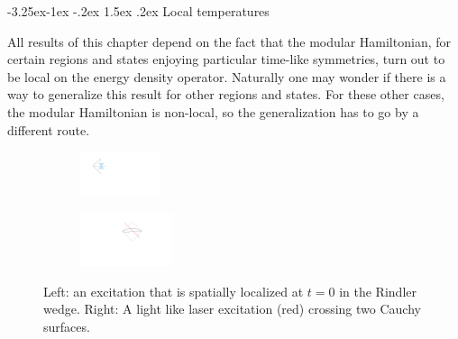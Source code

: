 \documentclass[11pt]{article}
\makeatletter
\renewcommand\subsection{\@startsection{subsection}{2}{\z@}%
                                   {-3.25ex\@plus -1ex \@minus -.2ex}%
                                     {1.5ex \@plus .2ex}%
                                     {\normalfont\bfseries}}
\numberwithin{equation}{section}
\makeatother
\begin{document}
\subsection{Local temperatures}

All results of this chapter depend on the fact that the modular Hamiltonian, for certain regions and states enjoying particular time-like symmetries, turn out to be local on the energy density operator. Naturally one may wonder if there is a way to generalize this result for other regions and states. For these other cases, the modular Hamiltonian is non-local, so the generalization has to go by a different route. 

\begin{figure}[t]  
\begin{subfigure}
\centering
\hspace{1.3cm}\includegraphics[width=0.26\textwidth]{uno.pdf}
\end{subfigure}
\hspace{2cm}
\begin{subfigure}
\centering
\includegraphics[width=0.3\textwidth]{dos.pdf}
\end{subfigure}
\captionsetup{width=0.9\textwidth}
\caption{Left: an excitation that is spatially localized at $t=0$ in the Rindler wedge. Right: A light like laser excitation (red) crossing two Cauchy surfaces.}
\label{rayo}
\end{figure}  
\end{document}
